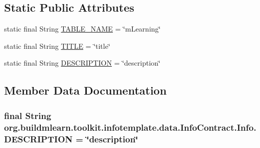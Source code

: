 \subsection*{Static Public Attributes}
\begin{DoxyCompactItemize}
\item 
static final String \hyperlink{classorg_1_1buildmlearn_1_1toolkit_1_1infotemplate_1_1data_1_1InfoContract_1_1Info_a5a7117b4841ab918cb9bbd92b3ce8e09}{T\+A\+B\+L\+E\+\_\+\+N\+A\+ME} = \char`\"{}m\+Learning\char`\"{}
\item 
static final String \hyperlink{classorg_1_1buildmlearn_1_1toolkit_1_1infotemplate_1_1data_1_1InfoContract_1_1Info_a1fe7ada37ca14f0968fba9d37dd638a4}{T\+I\+T\+LE} = \char`\"{}title\char`\"{}
\item 
static final String \hyperlink{classorg_1_1buildmlearn_1_1toolkit_1_1infotemplate_1_1data_1_1InfoContract_1_1Info_a8c880b66b45ad390d11d15709bf1804a}{D\+E\+S\+C\+R\+I\+P\+T\+I\+ON} = \char`\"{}description\char`\"{}
\end{DoxyCompactItemize}


\subsection{Member Data Documentation}
\subsubsection[{\texorpdfstring{D\+E\+S\+C\+R\+I\+P\+T\+I\+ON}{DESCRIPTION}}]{\setlength{\rightskip}{0pt plus 5cm}final String org.\+buildmlearn.\+toolkit.\+infotemplate.\+data.\+Info\+Contract.\+Info.\+D\+E\+S\+C\+R\+I\+P\+T\+I\+ON = \char`\"{}description\char`\"{}\hspace{0.3cm}{\ttfamily [static]}}\hypertarget{classorg_1_1buildmlearn_1_1toolkit_1_1infotemplate_1_1data_1_1InfoContract_1_1Info_a8c880b66b45ad390d11d15709bf1804a}{}\label{classorg_1_1buildmlearn_1_1toolkit_1_1infotemplate_1_1data_1_1InfoContract_1_1Info_a8c880b66b45ad390d11d15709bf1804a}
